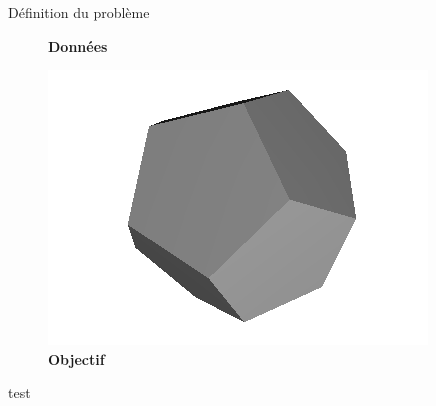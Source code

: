 \documentclass[compress]{beamer}
\begin{document}
\begin{frame}{Définition du problème}
\begin{minipage}{0.48\linewidth}
\begin{figure}
      {\footnotesize\textbf{Données}}
    \end{figure}
  \end{minipage}
  \hfill
  \begin{minipage}{0.48\linewidth}
    \centering
    \begin{figure}
      \centering
      \includegraphics[width=\linewidth]{capture/dodecaedre_objectif.png}
      {\footnotesize\textbf{Objectif}}
    \end{figure}
  \end{minipage}
\end{frame}

%




%
%

\begin{frame}
  test
\end{frame}
\end{document}
